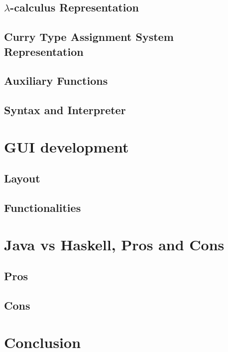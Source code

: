 \documentclass[a4paper,11pt,twoside]{report}
\begin{document}
\section{$\lambda$-calculus Representation}

\section{Curry Type Assignment System Representation}

\section{Auxiliary Functions}

\section{Syntax and Interpreter}

\chapter{GUI development}

\section{Layout}

\section{Functionalities}

\chapter{Java vs Haskell, Pros and Cons}

\section{Pros}

\section{Cons}

\chapter{Conclusion}
\end{document}
